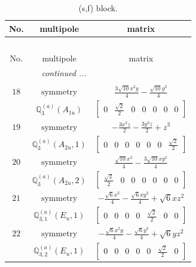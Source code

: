 \documentclass[fleqn,8pt,landscape]{jsarticle}
\begin{document}
\begin{longtable}{ccc}
\caption{(s,f) block.}
 \\
 \hline \hline
No. & multipole & matrix \\ \hline \endfirsthead

\multicolumn{2}{l}{\tablename\ \thetable{}} \\
 \hline \hline
No. & multipole & matrix \\ \hline \endhead

 \hline \hline
\multicolumn{2}{r}{\footnotesize\it continued ...} \\ \endfoot

 \hline \hline
\multicolumn{2}{r}{} \\ \endlastfoot

$ 18 $ & $ \text{symmetry} $ & $ \frac{3 \sqrt{10} x^{2} y}{4} - \frac{\sqrt{10} y^{3}}{4} $ \\
$  $ & $ \mathbb{Q}_{3}^{(a)}(A_{1u}) $ & $ \begin{bmatrix} 0 & \frac{\sqrt{2}}{2} & 0 & 0 & 0 & 0 & 0 \end{bmatrix} $ \\ \hline
$ 19 $ & $ \text{symmetry} $ & $ - \frac{3 x^{2} z}{2} - \frac{3 y^{2} z}{2} + z^{3} $ \\
$  $ & $ \mathbb{Q}_{3}^{(a)}(A_{2u},1) $ & $ \begin{bmatrix} 0 & 0 & 0 & 0 & 0 & 0 & \frac{\sqrt{2}}{2} \end{bmatrix} $ \\ \hline
$ 20 $ & $ \text{symmetry} $ & $ \frac{\sqrt{10} x^{3}}{4} - \frac{3 \sqrt{10} x y^{2}}{4} $ \\
$  $ & $ \mathbb{Q}_{3}^{(a)}(A_{2u},2) $ & $ \begin{bmatrix} \frac{\sqrt{2}}{2} & 0 & 0 & 0 & 0 & 0 & 0 \end{bmatrix} $ \\ \hline
$ 21 $ & $ \text{symmetry} $ & $ - \frac{\sqrt{6} x^{3}}{4} - \frac{\sqrt{6} x y^{2}}{4} + \sqrt{6} x z^{2} $ \\
$  $ & $ \mathbb{Q}_{3,1}^{(a)}(E_{u},1) $ & $ \begin{bmatrix} 0 & 0 & 0 & 0 & \frac{\sqrt{2}}{2} & 0 & 0 \end{bmatrix} $ \\ \hline
$ 22 $ & $ \text{symmetry} $ & $ - \frac{\sqrt{6} x^{2} y}{4} - \frac{\sqrt{6} y^{3}}{4} + \sqrt{6} y z^{2} $ \\
$  $ & $ \mathbb{Q}_{3,2}^{(a)}(E_{u},1) $ & $ \begin{bmatrix} 0 & 0 & 0 & 0 & 0 & \frac{\sqrt{2}}{2} & 0 \end{bmatrix} $ \\ \hline

\end{longtable}
\end{document}
